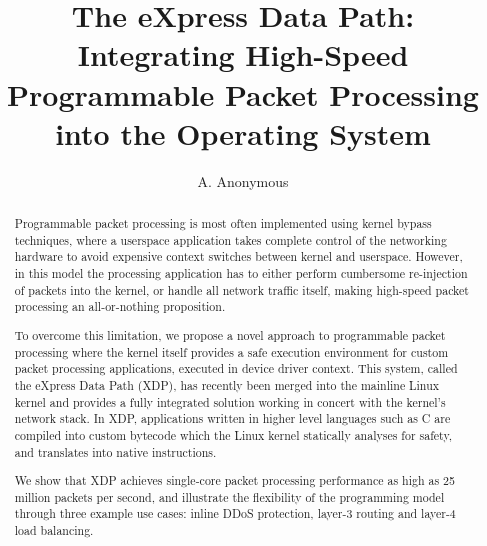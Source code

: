 \documentclass[10pt,sigconf]{acmart}
\begin{document}
\title{The eXpress Data Path:\\Integrating High-Speed Programmable Packet
  Processing into the Operating System}
%
%
%
%
%
%
%
\author{A. Anonymous}

\renewcommand{\shorttitle}{The eXpress Data Path}
\captionsetup{font+=small}

\begin{abstract}
  Programmable packet processing is most often implemented using kernel bypass
  techniques, where a userspace application takes complete control of the
  networking hardware to avoid expensive context switches between kernel and
  userspace. However, in this model the processing application has to either
  perform cumbersome re-injection of packets into the kernel, or handle all
  network traffic itself, making high-speed packet processing an all-or-nothing
  proposition.

  To overcome this limitation, we propose a novel approach to programmable
  packet processing where the kernel itself provides a safe execution
  environment for custom packet processing applications, executed in device
  driver context. This system, called the eXpress Data Path (XDP), has recently
  been merged into the mainline Linux kernel and provides a fully integrated
  solution working in concert with the kernel's network stack. In XDP,
  applications written in higher level languages such as C are compiled into
  custom bytecode which the Linux kernel statically analyses for safety, and
  translates into native instructions.

  We show that XDP achieves single-core packet processing performance as high as
  25 million packets per second, and illustrate the flexibility of the
  programming model through three example use cases: inline DDoS protection,
  layer-3 routing and layer-4 load balancing.
\end{abstract}
\end{document}
